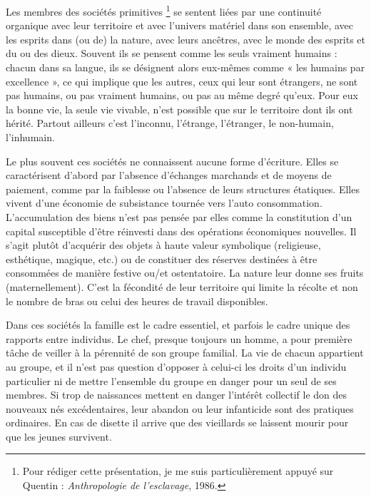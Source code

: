 Les membres des sociétés primitives%
\footnote{Pour rédiger cette présentation, je me suis particulièrement appuyé sur
Quentin  : \emph{Anthropologie de l'esclavage}, 1986.}
se sentent liées par une 
continuité organique avec leur territoire et avec l'univers matériel dans 
son ensemble, avec les esprits dans (ou de) la nature, avec leurs ancêtres, 
avec le monde des esprits et du ou des dieux. Souvent ils se pensent 
comme les seuls vraiment humains : chacun dans sa langue, ils se 
désignent alors eux-mêmes comme « les humains par excellence », ce
qui implique que les autres, ceux qui leur sont étrangers, ne sont pas humains, 
ou pas vraiment humains, ou pas au même degré qu'eux. Pour eux la 
bonne vie, la seule vie vivable, n'est possible que sur le territoire dont ils 
ont hérité. Partout ailleurs c'est l'inconnu, l'étrange, l'étranger, le
non-humain, l'inhumain.

Le plus souvent ces sociétés ne connaissent aucune forme
d'écriture. Elles se caractérisent d'abord par l'absence d'échanges marchands et 
de moyens de paiement, comme par la faiblesse ou l'absence de leurs 
structures étatiques. Elles vivent d'une économie de subsistance tournée 
vers l'auto consommation. L'accumulation des biens n'est pas pensée par 
elles comme la constitution d'un capital susceptible d'être réinvesti dans 
des opérations économiques nouvelles. Il s'agit plutôt d'acquérir des
objets à haute valeur symbolique (religieuse, esthétique, magique, etc.) ou 
de constituer des réserves destinées à être consommées de manière
festive ou/et ostentatoire. La nature leur donne ses fruits (maternellement). 
C'est la fécondité de leur territoire qui limite la récolte et non le nombre
de bras ou celui des heures de travail disponibles.

Dans ces sociétés la famille est le cadre essentiel, et parfois le
cadre unique des rapports entre individus. Le chef, presque toujours un 
homme, a pour première tâche de veiller à la pérennité de son groupe 
familial. La vie de chacun appartient au groupe, et il n'est pas question 
d'opposer à celui-ci les droits d'un individu particulier ni de mettre
l'ensemble du groupe en danger pour un seul de ses membres. Si trop de 
naissances mettent en danger l'intérêt collectif le don des nouveaux nés 
excédentaires, leur abandon ou leur infanticide sont des pratiques
ordinaires. En cas de disette il arrive que des vieillards se laissent mourir 
pour que les jeunes survivent.

